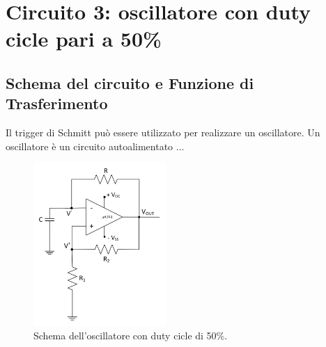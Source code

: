 \documentclass{report}
\begin{document}
\newpage\null\newpage %
\section{Circuito 3: oscillatore con duty cicle pari a 50\%}
\subsection{Schema del circuito e Funzione di Trasferimento}
Il trigger di Schmitt può essere utilizzato per realizzare un oscillatore. Un oscillatore è un circuito autoalimentato ...
\begin{figure}[h]
	\centering
	\includegraphics[height=6.2cm]{immagini/schema3}
	\caption{Schema dell'oscillatore con duty cicle di 50\%.}
	\label{figura:schema3}
\end{figure}
\end{document}
